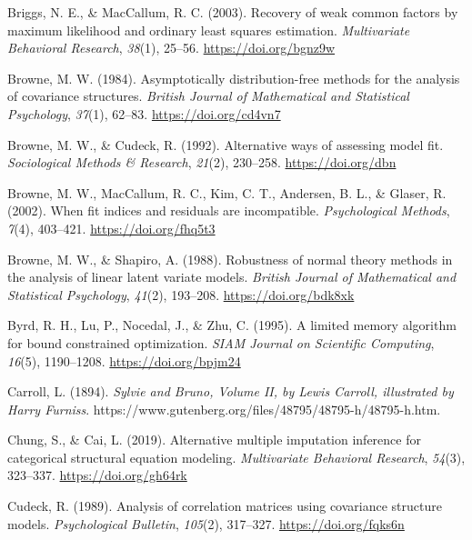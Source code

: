 \documentclass[11pt]{umnthesis}
\newlength{\cslhangindent}
\newenvironment{CSLReferences}[2] %
 {%
  \setlength{\parindent}{0pt}
  \ifodd #1 \everypar{\setlength{\hangindent}{\cslhangindent}}\ignorespaces\fi
  \ifnum #2 > 0
  \setlength{\parskip}{#2\baselineskip}
  \fi
 }%
 {}
\begin{document}
\begin{CSLReferences}{1}{0}
\leavevmode{}%
Briggs, N. E., \& MacCallum, R. C. (2003). Recovery of weak common factors by maximum likelihood and ordinary least squares estimation. \emph{Multivariate Behavioral Research}, \emph{38}(1), 25--56. \url{https://doi.org/bgnz9w}

\leavevmode{}%
Browne, M. W. (1984). Asymptotically distribution-free methods for the analysis of covariance structures. \emph{British Journal of Mathematical and Statistical Psychology}, \emph{37}(1), 62--83. \url{https://doi.org/cd4vn7}

\leavevmode{}%
Browne, M. W., \& Cudeck, R. (1992). Alternative ways of assessing model fit. \emph{Sociological Methods \& Research}, \emph{21}(2), 230--258. \url{https://doi.org/dbn}

\leavevmode{}%
Browne, M. W., MacCallum, R. C., Kim, C. T., Andersen, B. L., \& Glaser, R. (2002). When fit indices and residuals are incompatible. \emph{Psychological Methods}, \emph{7}(4), 403--421. \url{https://doi.org/fhq5t3}

\leavevmode{}%
Browne, M. W., \& Shapiro, A. (1988). Robustness of normal theory methods in the analysis of linear latent variate models. \emph{British Journal of Mathematical and Statistical Psychology}, \emph{41}(2), 193--208. \url{https://doi.org/bdk8xk}

\leavevmode{}%
Byrd, R. H., Lu, P., Nocedal, J., \& Zhu, C. (1995). A limited memory algorithm for bound constrained optimization. \emph{SIAM Journal on Scientific Computing}, \emph{16}(5), 1190--1208. \url{https://doi.org/bpjm24}

\leavevmode{}%
Carroll, L. (1894). \emph{Sylvie and {Bruno}, {Volume II}, by {Lewis Carroll}, illustrated by {Harry Furniss}}. https://www.gutenberg.org/files/48795/48795-h/48795-h.htm.

\leavevmode{}%
Chung, S., \& Cai, L. (2019). Alternative multiple imputation inference for categorical structural equation modeling. \emph{Multivariate Behavioral Research}, \emph{54}(3), 323--337. \url{https://doi.org/gh64rk}

\leavevmode{}%
Cudeck, R. (1989). Analysis of correlation matrices using covariance structure models. \emph{Psychological Bulletin}, \emph{105}(2), 317--327. \url{https://doi.org/fqks6n}


\end{CSLReferences}
\end{document}
